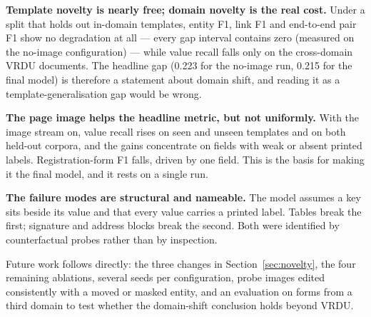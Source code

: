 \documentclass[11pt,a4paper]{article}
\begin{document}
\textbf{Template novelty is nearly free; domain novelty is the real cost.} Under a split that
holds out in-domain templates, entity F1, link F1 and end-to-end pair F1 show no degradation at
all --- every gap interval contains zero (measured on the no-image configuration) --- while value recall falls only on the cross-domain
VRDU documents. The headline gap (0.223 for the no-image run, 0.215 for the final model) is therefore a statement about domain shift, and
reading it as a template-generalisation gap would be wrong.

\textbf{The page image helps the headline metric, but not uniformly.} With the image stream on,
value recall rises on seen and unseen templates and on both held-out corpora, and the gains
concentrate on fields with weak or absent printed labels. Registration-form F1 falls, driven by
one field. This is the basis for making it the final model, and it rests on a single run.

\textbf{The failure modes are structural and nameable.} The model assumes a key sits beside its
value and that every value carries a printed label. Tables break the first; signature and address
blocks break the second. Both were identified by counterfactual probes rather than by inspection.

Future work follows directly: the three changes in Section~\ref{sec:novelty}, the four remaining
ablations, several seeds per configuration, probe images edited consistently with a moved or masked
entity, and an evaluation on forms from a third domain to test whether the domain-shift conclusion
holds beyond VRDU.
\end{document}

